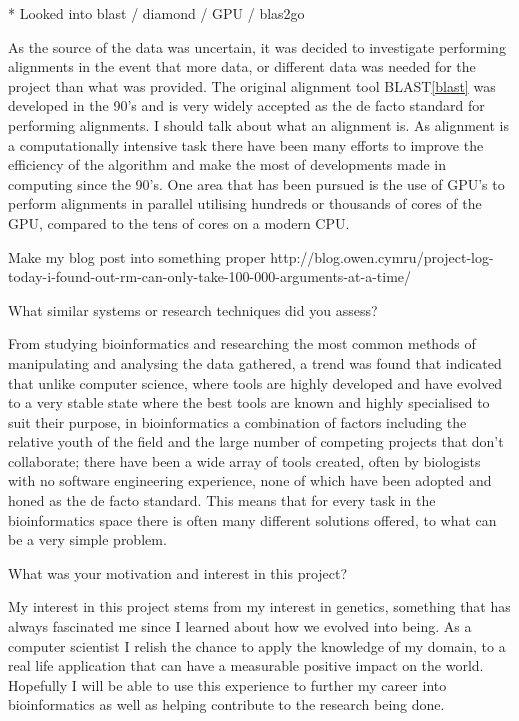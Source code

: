 * Looked into blast / diamond / GPU / blas2go

As the source of the data was uncertain, it was decided to investigate performing alignments in the event that more data, or different data was needed for the project than what was provided. The original alignment tool BLAST\ref{blast} was developed in the 90's and is very widely accepted as the de facto standard for performing alignments. I should talk about what an alignment is. As alignment is a computationally intensive task there have been many efforts to improve the efficiency of the algorithm and make the most of developments made in computing since the 90's. One area that has been pursued is the use of GPU's to perform alignments in parallel utilising hundreds or thousands of cores of the GPU, compared to the tens of cores on a modern CPU. 

Make my blog post into something proper http://blog.owen.cymru/project-log-today-i-found-out-rm-can-only-take-100-000-arguments-at-a-time/


What similar systems or research techniques did you assess? 

From studying bioinformatics and researching the most common methods of manipulating and analysing the data gathered, a trend was found that indicated that unlike computer science, where tools are highly developed and have evolved to a very stable state where the best tools are known and highly specialised to suit their purpose, in bioinformatics a combination of factors including the relative youth of the field and the large number of competing projects that don't collaborate; there have been a wide array of tools created, often by biologists with no software engineering experience, none of which have been adopted and honed as the de facto standard. This means that for every task in the bioinformatics space there is often many different solutions offered, to what can be a very simple problem. 

What was your motivation and interest in this project? 

My interest in this project stems from my interest in genetics, something that has always fascinated me since I learned about how we evolved into being. As a computer scientist I relish the chance to apply the knowledge of my domain, to a real life application that can have a measurable positive impact on the world. Hopefully I will be able to use this experience to further my career into bioinformatics as well as helping contribute to the research being done. 

